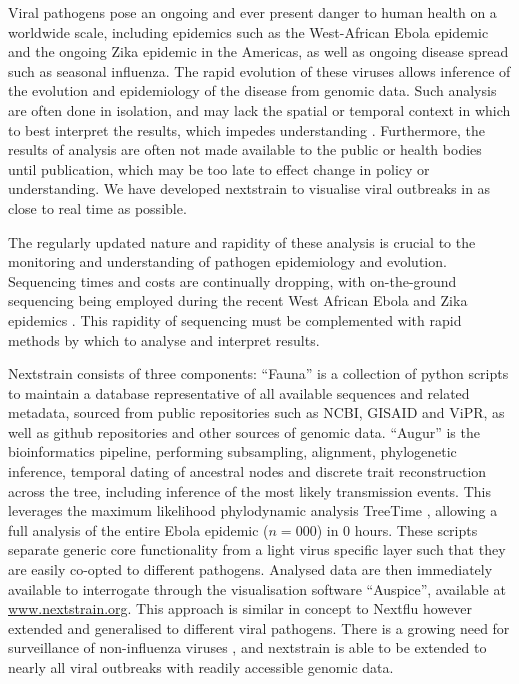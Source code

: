 \documentclass{bioinfo}
\begin{document}
\maketitle

Viral pathogens pose an ongoing and ever present danger to human health on a worldwide scale, including epidemics such as the West-African Ebola epidemic and the ongoing Zika epidemic in the Americas, as well as ongoing disease spread such as seasonal influenza.
The rapid evolution of these viruses allows inference of the evolution and epidemiology of the disease from genomic data.
Such analysis are often done in isolation, and may lack the spatial or temporal context in which to best interpret the results, which impedes understanding \citep{pybus2013evolutionary}.
Furthermore, the results of analysis are often not made available to the public or health bodies until publication, which may be too late to effect change in policy or understanding.
We have developed nextstrain to visualise viral outbreaks in as close to real time as possible.


The regularly updated nature and rapidity of these analysis is crucial to the monitoring and understanding of pathogen epidemiology and evolution.
Sequencing times and costs are continually dropping, with on-the-ground sequencing being employed during the recent West African Ebola and Zika epidemics \citep{quick2016real,faria2017epidemic}.
This rapidity of sequencing must be complemented with rapid methods by which to analyse and interpret results.


Nextstrain consists of three components:
``Fauna'' is a collection of python scripts to maintain a database representative of all available sequences and related metadata, sourced from public repositories such as NCBI, GISAID and ViPR, as well as github repositories and other sources of genomic data. ``Augur'' is the bioinformatics pipeline, performing subsampling, alignment, phylogenetic inference, temporal dating of ancestral nodes and discrete trait reconstruction across the tree, including inference of the most likely transmission events.
This leverages the maximum likelihood phylodynamic analysis TreeTime \citep{sagulenko2017treetime}, allowing a full analysis of the entire Ebola epidemic ($n=000$) in 0 hours.
These scripts separate generic core functionality from a light virus specific layer such that they are easily co-opted to different pathogens.
Analysed data are then immediately available to interrogate through the visualisation software ``Auspice'', available at \href{www.nextstrain.org}{www.nextstrain.org}.
This approach is similar in concept to Nextflu \citep{neher2015nextflu} however extended and generalised to different viral pathogens.
There is a growing need for surveillance of non-influenza viruses \citep{tang2017global}, and nextstrain is able to be extended to nearly all viral outbreaks with readily accessible genomic data.
\end{document}
